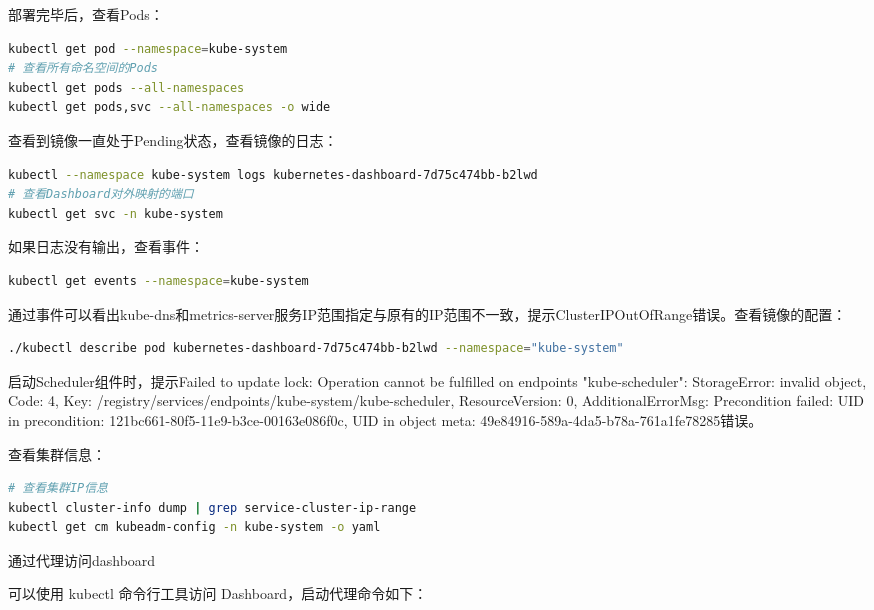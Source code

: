 \documentclass[8pt]{book}
\makeatletter
\numberwithin{dummy}{section}
\theoremstyle{ocrenumbox}
\theoremstyle{blacknumex}
\theoremstyle{blacknumbox}
\theoremstyle{ocrenum}
\renewcommand{\subsubsection}{\@startsection {subsubsection}{3}{\z@}
	{-2ex \@plus -0.1ex \@minus -.2ex}
	{.2ex \@plus.2ex }
	{\normalfont\small\sffamily\bfseries}}
\newlength\esp
\makeatother
\begin{document}
部署完毕后，查看Pods：

\begin{lstlisting}[language=Bash]
kubectl get pod --namespace=kube-system
# 查看所有命名空间的Pods
kubectl get pods --all-namespaces
kubectl get pods,svc --all-namespaces -o wide
\end{lstlisting}

查看到镜像一直处于Pending状态，查看镜像的日志：

\begin{lstlisting}[language=Bash]
kubectl --namespace kube-system logs kubernetes-dashboard-7d75c474bb-b2lwd
# 查看Dashboard对外映射的端口
kubectl get svc -n kube-system
\end{lstlisting}

如果日志没有输出，查看事件：

\begin{lstlisting}[language=Bash]
kubectl get events --namespace=kube-system
\end{lstlisting}

通过事件可以看出kube-dns和metrics-server服务IP范围指定与原有的IP范围不一致，提示ClusterIPOutOfRange错误。查看镜像的配置：

\begin{lstlisting}[language=Bash]
./kubectl describe pod kubernetes-dashboard-7d75c474bb-b2lwd --namespace="kube-system"
\end{lstlisting}

启动Scheduler组件时，提示Failed to update lock: Operation cannot be fulfilled on endpoints "kube-scheduler": StorageError: invalid object, Code: 4, Key: /registry/services/endpoints/kube-system/kube-scheduler, ResourceVersion: 0, AdditionalErrorMsg: Precondition failed: UID in precondition: 121bc661-80f5-11e9-b3ce-00163e086f0c, UID in object meta: 49e84916-589a-4da5-b78a-761a1fe78285错误。

查看集群信息：

\begin{lstlisting}[language=Bash]
# 查看集群IP信息
kubectl cluster-info dump | grep service-cluster-ip-range
kubectl get cm kubeadm-config -n kube-system -o yaml
\end{lstlisting}


\subsubsection{通过代理访问dashboard}

可以使用 kubectl 命令行工具访问 Dashboard，启动代理命令如下：
\end{document}
